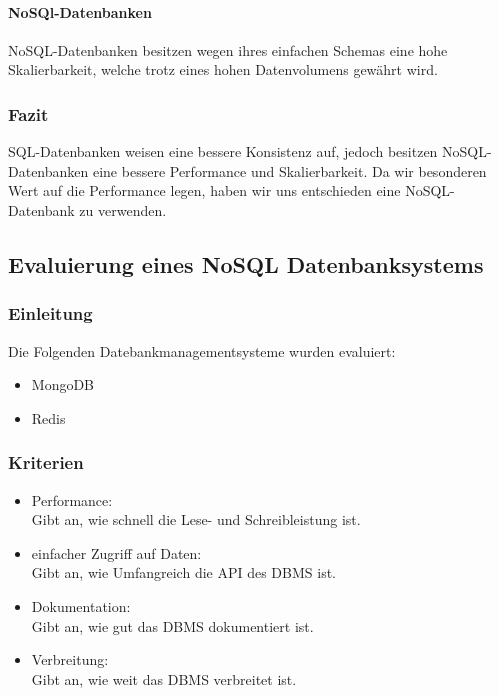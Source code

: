 \documentclass[11pt]{article}
\begin{document}
\paragraph{NoSQl-Datenbanken}
NoSQL-Datenbanken besitzen wegen ihres einfachen Schemas eine hohe Skalierbarkeit, welche trotz eines
hohen Datenvolumens gew\"ahrt wird.

\subsubsection{Fazit}
SQL-Datenbanken weisen eine bessere Konsistenz auf, jedoch besitzen NoSQL-Datenbanken
eine bessere Performance und Skalierbarkeit. Da wir besonderen Wert auf die Performance
legen, haben wir uns entschieden eine NoSQL-Datenbank zu verwenden.

\subsection{Evaluierung eines NoSQL Datenbanksystems}

\subsubsection{Einleitung}
Die Folgenden Datebankmanagementsysteme wurden evaluiert:

\begin{itemize}
	\item MongoDB
	\item Redis
\end{itemize}

\subsubsection{Kriterien}

\begin{itemize}
	\item Performance: \\Gibt an, wie schnell die Lese- und Schreibleistung ist.
	\item einfacher Zugriff auf Daten: \\Gibt an, wie Umfangreich die API des DBMS ist.
	\item Dokumentation:\\ Gibt an, wie gut das DBMS dokumentiert ist.
	\item Verbreitung:\\ Gibt an, wie weit das DBMS verbreitet ist.
\end{itemize}
\end{document}
